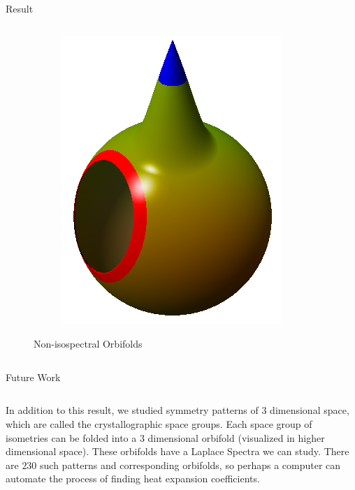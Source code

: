 \documentclass[final]{beamer}
\newlength{\onecolwid}
\begin{document}
\begin{frame}[t]
\begin{columns}[t]
\begin{column}{\onecolwid}
\begin{block}{Result}
\begin{columns}[t]
\begin{column}[t]{0.59\textwidth}
\begin{figure}
\begin{subfigure}[t]{0.49\textwidth}
            \includegraphics[width=\textwidth]{images/teardrop_edge.png}
        \end{subfigure}
        \caption{Non-isospectral Orbifolds}
        \label{fig:result_ex}
    \end{figure}
    \end{column}
    \end{columns}
\end{block}
\begin{block}{Future Work}
\begin{columns}[t]
    \begin{column}[t]{0.61\textwidth}
In addition to this result, we studied symmetry patterns of $3$
dimensional space, which are called the crystallographic space groups. Each space group
of isometries can be folded into a $3$ dimensional orbifold (visualized in
higher dimensional space). These orbifolds have a Laplace Spectra we can
study. There are $230$ such patterns and corresponding orbifolds, so perhaps
a computer can automate the process of finding heat expansion coefficients.

\end{column}
\end{columns}
\end{block}
\end{column}
\end{columns}
\end{frame}
\end{document}
